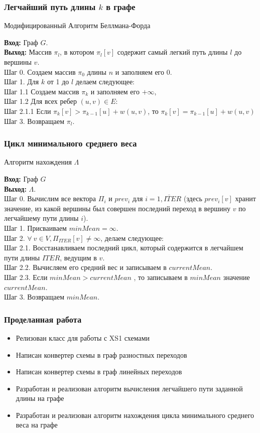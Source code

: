 \documentclass{beamer}
\begin{document}
\begin{frame}
    \frametitle{Легчайший путь длины $k$ в графе}
\begin{algorithm}[H]
\caption{Модифицированный Алгоритм Беллмана-Форда}
\label{diff_graph_construct}
\textbf{Вход:} Граф $G$.\\
\textbf{Выход:} Массив $\pi_l$, в котором $\pi_l[v]$ содержит самый легкий путь длины $l$ до вершины $v$.\\
Шаг 0. Создаем массив $\pi_0$ длины $n$ и заполняем его $0$. \\
Шаг 1. Для $k$ от 1 до $l$ делаем следующее:\\
Шаг 1.1 Создаем массив $\pi_k$ и заполняем его $+\infty$,\\
Шаг 1.2 Для всех ребер $(u, v) \in E:$\\
Шаг 2.1.1 Если $\pi_k[v] > \pi_{k-1}[u] + w(u,v)$, то $\pi_k[v] = \pi_{k-1}[u] + w(u,v)$\\
Шаг 3. Возвращаем $\pi_l$.\\
\end{algorithm}
  \end{frame}
\begin{frame}
    \frametitle{Цикл минимального среднего веса}
\begin{algorithm}[H]
\caption{Алгоритм нахождения $\Lambda$}
\label{diff_graph_construct}
\textbf{Вход:} Граф $G$\\
\textbf{Выход:} $\Lambda$.\\
Шаг 0. Вычислим все вектора $\Pi_i$ и $prev_i$ для $i = \overline{1, ITER}$ (здесь $prev_i[v]$ хранит значение, из какой вершины был совершен последний переход в вершину $v$ по легчайшему пути длины $i$).\\
Шаг 1. Присваиваем $minMean = \infty$.\\
Шаг 2.  $\forall ~v \in V, \Pi_{ITER}[v] \ne \infty$, делаем следующее:\\
Шаг 2.1. Восстанавливаем последний цикл, который содержится в легчайшем пути длины $ITER$, ведущим в $v$. \\
Шаг 2.2. Вычисляем его средний вес и записываем в $currentMean$.\\
Шаг 2.3. Если $minMean > currentMean$ , то записываем в $minMean$ значение $currentMean$.\\
Шаг 3. Возвращаем $minMean$.\\ 
\end{algorithm}
  \end{frame}
\begin{frame}
    \frametitle{Проделанная работа}
\begin{itemize}
\item Релизован класс для работы с XS1 схемами
\item Написан конвертер схемы в граф разностных переходов
\item Написан конвертер схемы в граф линейных переходов
\item Разработан и реализован алгоритм вычисления легчайшего пути заданной длины на графе
\item Разработан и реализован алгоритм нахождения цикла минимального среднего веса на графе
\end{itemize}
  \end{frame}
\end{document}
